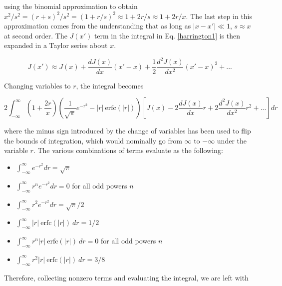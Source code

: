 \documentclass[onecolumn]{aastex63}
\begin{document}
\noindent using the binomial approximation to obtain $x^2/s^2 = (r+s)^2/s^2 = (1+r/s)^2 \approx 1 + 2r/s \approx 1 + 2r/x$. The last step in this approximation comes from the understanding that as long as $|x-x'|\ll 1$, $s \approx x$ at second order. The $J(x')$ term in the integral in Eq. \ref{harrington1} is then expanded in a Taylor series about $x$.

\begin{equation}
    J(x') \approx J(x) + \frac{dJ(x)}{dx}(x' - x) + \frac{1}{2}\frac{d^2J(x)}{dx^2}(x'-x)^2 + ...
\end{equation}

\noindent Changing variables to $r$, the integral becomes

\begin{equation}
    2 \int_{-\infty}^{\infty} \left(1+\frac{2r}{x}\right)\left(\frac{1}{\sqrt{\pi}}e^{-r^2} - |r|\ \mathrm{erfc}(|r|)\right)\left[J(x) - 2\frac{dJ(x)}{dx}r + 2\frac{d^2J(x)}{dx^2}r^2 + ...\right] dr
\end{equation}

\noindent where the minus sign introduced by the change of variables has been used to flip the bounds of integration, which would nominally go from $\infty$ to $-\infty$ under the variable $r$. The various combinations of terms evaluate as the following:

\begin{itemize}
    \item $\int_{-\infty}^{\infty} e^{-r^2} dr = \sqrt{\pi}$
    \item $\int_{-\infty}^{\infty} r^{n} e^{-r^2} dr = 0$ for all odd powers $n$
    \item $\int_{-\infty}^{\infty} r^2 e^{-r^2} dr = \sqrt{\pi}/2$
    \item $\int_{-\infty}^{\infty} |r|\ \mathrm{erfc}(|r|)\ dr = 1/2$
    \item $\int_{-\infty}^{\infty} r^n |r|\ \mathrm{erfc}(|r|)\ dr = 0$ for all odd powers $n$
    \item $\int_{-\infty}^{\infty} r^2 |r|\ \mathrm{erfc}(|r|)\ dr = 3/8$
\end{itemize}

\noindent Therefore, collecting nonzero terms and evaluating the integral, we are left with
\end{document}
